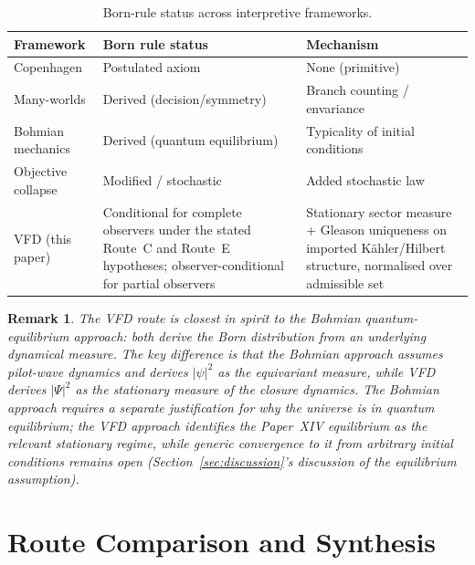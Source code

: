 \documentclass[12pt]{article}
\newtheorem{remark}[theorem]{Remark}
\begin{document}
\begin{table}[ht]
\centering
\caption{Born-rule status across interpretive frameworks.}
\label{tab:born}
\begin{tabular}{@{}lll@{}}
\toprule
Framework & Born rule status & Mechanism \\
\midrule
Copenhagen & Postulated axiom & None (primitive) \\
Many-worlds & Derived (decision/symmetry) & Branch counting / envariance \\
Bohmian mechanics & Derived (quantum equilibrium) & Typicality of initial conditions \\
Objective collapse & Modified / stochastic & Added stochastic law \\
VFD (this paper) & Conditional for complete observers under the stated Route~C and Route~E hypotheses; observer-conditional for partial observers & Stationary sector measure + Gleason uniqueness on imported K\"ahler/Hilbert structure, normalised over admissible set \\
\bottomrule
\end{tabular}
\end{table}

\begin{remark}
The VFD route is closest in spirit to the Bohmian quantum-equilibrium approach: both derive the Born distribution from an underlying dynamical measure. The key difference is that the Bohmian approach assumes pilot-wave dynamics and derives $|\psi|^2$ as the equivariant measure, while VFD derives $|\Psi|^2$ as the stationary measure of the closure dynamics. The Bohmian approach requires a separate justification for why the universe is in quantum equilibrium; the VFD approach identifies the Paper~XIV equilibrium as the relevant stationary regime, while generic convergence to it from arbitrary initial conditions remains open (Section~\ref{sec:discussion}'s discussion of the equilibrium assumption).
\end{remark}

\section{Route Comparison and Synthesis}\label{sec:synthesis}
\end{document}
